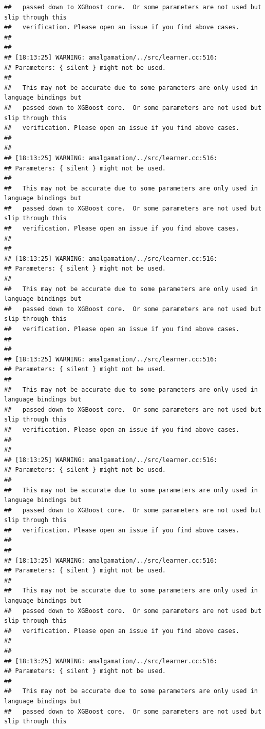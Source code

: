 \documentclass[AMS,STIX2COL]{WileyNJD-v2}\usepackage[]{graphicx}\usepackage[]{color}
\makeatletter
\newenvironment{kframe}{%
 \def\at@end@of@kframe{}%
 \ifinner\ifhmode%
  \def\at@end@of@kframe{\end{minipage}}%
  \begin{minipage}{\columnwidth}%
 \fi\fi%
 \def\FrameCommand##1{\hskip\@totalleftmargin \hskip-\fboxsep
 \colorbox{shadecolor}{##1}\hskip-\fboxsep
     \hskip-\linewidth \hskip-\@totalleftmargin \hskip\columnwidth}%
 \MakeFramed {\advance\hsize-\width
   \@totalleftmargin\z@ \linewidth\hsize
   \@setminipage}}%
 {\par\unskip\endMakeFramed%
 \at@end@of@kframe}
\newenvironment{knitrout}{}{} %
\makeatother
\begin{document}
\begin{knitrout}
\begin{kframe}
\begin{verbatim}
##   passed down to XGBoost core.  Or some parameters are not used but slip through this
##   verification. Please open an issue if you find above cases.
## 
## 
## [18:13:25] WARNING: amalgamation/../src/learner.cc:516: 
## Parameters: { silent } might not be used.
## 
##   This may not be accurate due to some parameters are only used in language bindings but
##   passed down to XGBoost core.  Or some parameters are not used but slip through this
##   verification. Please open an issue if you find above cases.
## 
## 
## [18:13:25] WARNING: amalgamation/../src/learner.cc:516: 
## Parameters: { silent } might not be used.
## 
##   This may not be accurate due to some parameters are only used in language bindings but
##   passed down to XGBoost core.  Or some parameters are not used but slip through this
##   verification. Please open an issue if you find above cases.
## 
## 
## [18:13:25] WARNING: amalgamation/../src/learner.cc:516: 
## Parameters: { silent } might not be used.
## 
##   This may not be accurate due to some parameters are only used in language bindings but
##   passed down to XGBoost core.  Or some parameters are not used but slip through this
##   verification. Please open an issue if you find above cases.
## 
## 
## [18:13:25] WARNING: amalgamation/../src/learner.cc:516: 
## Parameters: { silent } might not be used.
## 
##   This may not be accurate due to some parameters are only used in language bindings but
##   passed down to XGBoost core.  Or some parameters are not used but slip through this
##   verification. Please open an issue if you find above cases.
## 
## 
## [18:13:25] WARNING: amalgamation/../src/learner.cc:516: 
## Parameters: { silent } might not be used.
## 
##   This may not be accurate due to some parameters are only used in language bindings but
##   passed down to XGBoost core.  Or some parameters are not used but slip through this
##   verification. Please open an issue if you find above cases.
## 
## 
## [18:13:25] WARNING: amalgamation/../src/learner.cc:516: 
## Parameters: { silent } might not be used.
## 
##   This may not be accurate due to some parameters are only used in language bindings but
##   passed down to XGBoost core.  Or some parameters are not used but slip through this
##   verification. Please open an issue if you find above cases.
## 
## 
## [18:13:25] WARNING: amalgamation/../src/learner.cc:516: 
## Parameters: { silent } might not be used.
## 
##   This may not be accurate due to some parameters are only used in language bindings but
##   passed down to XGBoost core.  Or some parameters are not used but slip through this

\end{verbatim}
\end{kframe}
\end{knitrout}
\end{document}
